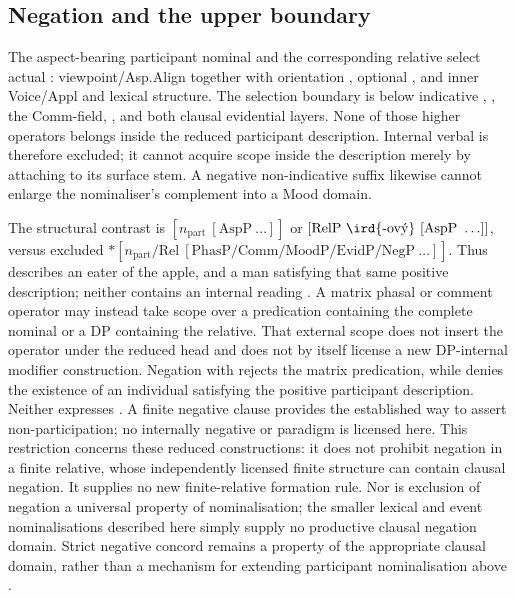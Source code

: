 \subsection{Negation and the upper boundary}
The aspect-bearing participant nominal and the corresponding 
relative select actual : viewpoint/Asp.Align together with
orientation , optional , and inner
Voice/Appl and lexical structure. The selection boundary is below indicative
, , the Comm-field, , and both
clausal evidential layers. None of those higher operators belongs inside the
reduced participant description. Internal verbal  is therefore
excluded; it cannot acquire scope inside the description merely by attaching
to its surface stem. A negative non-indicative suffix likewise cannot enlarge
the nominaliser's complement into a Mood domain.

The structural contrast is
$[n_{\mathrm{part}}\ [\mathrm{AspP}\ \ldots]]$ or
$[\mathrm{RelP}\ \text{\ird{-ový}}\ [\mathrm{AspP}\ \ldots]]$, versus excluded
$*[n_{\mathrm{part}}/\mathrm{Rel}\ [\mathrm{PhasP}/\mathrm{Comm}/
\mathrm{MoodP}/\mathrm{EvidP}/\mathrm{NegP}\ \ldots]]$.
Thus  describes an eater of the apple, and
 a man satisfying that same positive description;
neither contains an internal reading . A matrix phasal or comment operator may instead take scope over a
predication containing the complete nominal or a DP containing the relative.
That external scope does not insert the operator under the reduced head and
does not by itself license a new DP-internal modifier construction. Negation with
 rejects the matrix predication, while  denies the
existence of an individual satisfying the positive participant description.
Neither expresses . A finite negative clause
provides the established way to assert non-participation; no internally
negative  or  paradigm is licensed here. This restriction
concerns these reduced constructions: it does not prohibit negation in a
finite relative, whose independently licensed finite structure can contain
clausal negation. It supplies no new finite-relative formation rule. Nor is
exclusion of negation a universal property of nominalisation; the smaller
lexical and event nominalisations described here simply supply no productive
clausal negation domain. Strict negative concord remains a property of the
appropriate clausal domain, rather than a mechanism for extending participant
nominalisation above .

